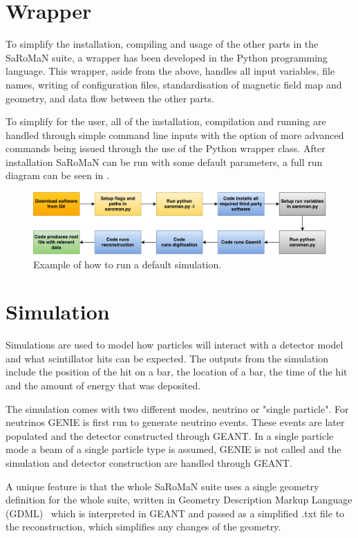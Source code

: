 \section{Wrapper}
To simplify the installation, compiling and usage of the other parts in the SaRoMaN suite, a wrapper has been developed in the Python programming language. This wrapper, aside from the above, handles all input variables, file names, writing of configuration files, standardisation of magnetic field map and geometry, and data flow between the other parts. 

To simplify for the user, all of the installation, compilation and running are handled through simple command line inputs with the option of more advanced commands being issued through the use of the Python wrapper class. After installation SaRoMaN can be run with some default parameters, a full run diagram can be seen in .

\begin{figure}[h!]
\centering
\includegraphics[width=\textwidth]{figures/block.pdf}
\caption{Example of how to run a default simulation.}
\label{fig:block}
\end{figure}

\section{Simulation}
Simulations are used to model how particles will interact with a detector model and what scintillator hits can be expected. The outputs from the simulation include the position of the hit on a bar, the location of a bar, the time of the hit and the amount of energy that was deposited.

The simulation comes with two different modes, neutrino or "single particle". For neutrinos GENIE is first run to generate neutrino events. These events are later populated and the detector constructed through GEANT. In a single particle mode a beam of a single particle type is assumed, GENIE is not called and the simulation and detector construction are handled through GEANT.

A unique feature is that the whole SaRoMaN suite uses a single geometry definition for the whole suite, written in Geometry Description Markup Language (GDML)~\cite{GDML} which is interpreted in GEANT and passed as a simplified .txt file to the reconstruction, which simplifies any changes of the geometry. 

